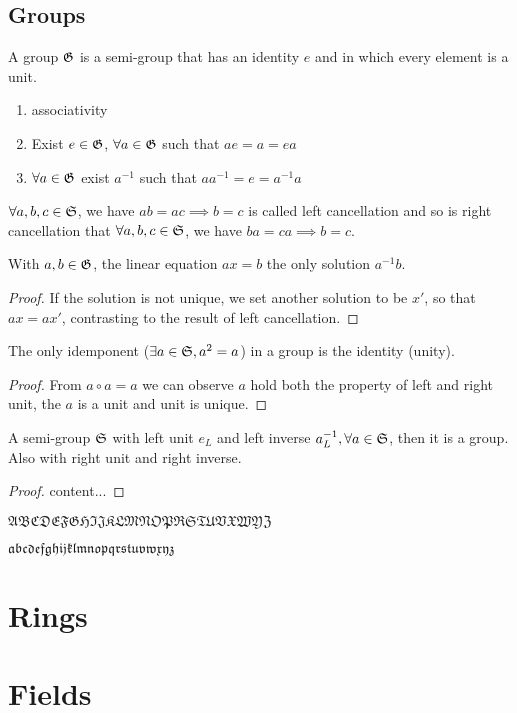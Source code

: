	\subsection{Groups}
		\begin{definition}
		A group $\mathfrak{G}$ is a semi-group that has an identity $e$ and in which every element is a unit.
		\begin{enumerate}
		\item associativity
		\item Exist $e\in\mathfrak{G}$, $\forall a\in\mathfrak{G}$ such that $ae=a=ea$
		\item $\forall a\in\mathfrak{G}$ exist $a^{-1}$ such that $aa^{-1}=e=a^{-1}a$
		\end{enumerate}
		\end{definition}
		\begin{definition}
		$\forall a,b,c\in\mathfrak{S}$, we have $ab=ac\implies b=c$ is called left cancellation and so is right cancellation that $\forall a,b,c\in\mathfrak{S}$, we have $ba=ca\implies b=c$.
		\end{definition}
		\begin{theorem}
		With $a,b\in\mathfrak{G}$, the linear equation $ax=b$ the only solution $a^{-1}b$.
		\end{theorem}
		\begin{proof}
		If the solution is not unique, we set another solution to be $x'$, so that $ax=ax'$, contrasting to the result of left cancellation.
		\end{proof}
		\begin{theorem}
		The only idemponent ($\exists a\in\mathfrak{S}, a^2=a$) in a group is the identity (unity).
		\end{theorem}
		\begin{proof}
		From $a\circ a=a$ we can observe $a$ hold both the property of left and right unit, the $a$ is a unit and unit is unique.
		\end{proof}
		\begin{theorem}
		A semi-group $\mathfrak{S}$ with left unit $e_L$ and left inverse $a^{-1}_L, \forall a\in\mathfrak{S}$, then it is a group. Also with right unit and right inverse.
		\end{theorem}
		\begin{proof}
		content...
		\end{proof}
	$\mathfrak{ABCDEFGHIJKLMNOPRSTUVXWYZ}$
	
	$\mathfrak{abcdefghijklmnopqrstuvwxyz}$
	\section{Rings}
	\section{Fields}
	
